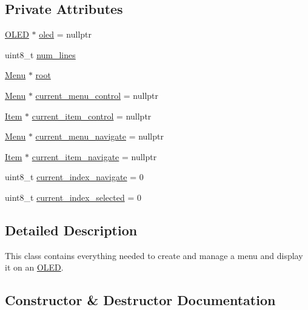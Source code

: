 \subsection*{Private Attributes}
\begin{DoxyCompactItemize}
\item 
\hyperlink{class_o_l_e_d}{O\+L\+ED} $\ast$ \hyperlink{class_menu_1_1_controller_aaa0388123d9e3bb0d4f546336e2b502d}{oled} = nullptr
\item 
uint8\+\_\+t \hyperlink{class_menu_1_1_controller_a80d614a66d1ffa2612688776842f1f31}{num\+\_\+lines}
\item 
\hyperlink{struct_menu_1_1_menu}{Menu} $\ast$ \hyperlink{class_menu_1_1_controller_a211b6de05f7eed25f3a7f504c42316e0}{root}
\item 
\hyperlink{struct_menu_1_1_menu}{Menu} $\ast$ \hyperlink{class_menu_1_1_controller_a912ad4ad6b2c30e7cddf44547585a909}{current\+\_\+menu\+\_\+control} = nullptr
\item 
\hyperlink{struct_menu_1_1_item}{Item} $\ast$ \hyperlink{class_menu_1_1_controller_a288e26b1efe4fd953b5514de72a1c508}{current\+\_\+item\+\_\+control} = nullptr
\item 
\hyperlink{struct_menu_1_1_menu}{Menu} $\ast$ \hyperlink{class_menu_1_1_controller_a66ffabf19a4423ccca536762f0b9df88}{current\+\_\+menu\+\_\+navigate} = nullptr
\item 
\hyperlink{struct_menu_1_1_item}{Item} $\ast$ \hyperlink{class_menu_1_1_controller_a6dfb1678cc8fd44570806ff680ac27cf}{current\+\_\+item\+\_\+navigate} = nullptr
\item 
uint8\+\_\+t \hyperlink{class_menu_1_1_controller_a86055b66afbad89c5a0b8a0a1713f9d3}{current\+\_\+index\+\_\+navigate} = 0
\item 
uint8\+\_\+t \hyperlink{class_menu_1_1_controller_ab3bdee08f22d55f8fa0cb9e29bb27d66}{current\+\_\+index\+\_\+selected} = 0
\end{DoxyCompactItemize}


\subsection{Detailed Description}
This class contains everything needed to create and manage a menu and display it on an \hyperlink{class_o_l_e_d}{O\+L\+ED}. 

\subsection{Constructor \& Destructor Documentation}
